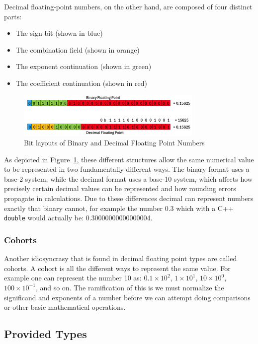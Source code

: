 \documentclass[acmsmall]{acmart}
\newcommand{\code}[1]{\texttt{#1}}
\begin{document}
Decimal floating-point numbers, on the other hand, are composed of four distinct parts:
\begin{itemize}
    \item The sign bit (shown in blue)
    \item The combination field (shown in orange)
    \item The exponent continuation (shown in green)
    \item The coefficient continuation (shown in red)
\end{itemize}

\begin{figure}[t]
    \centering
    \includegraphics[width=0.8\textwidth]{layout.png}
    \caption{Bit layouts of Binary and Decimal Floating Point Numbers}
    \label{fig:fp-layouts}
\end{figure}

As depicted in Figure~\ref{fig:fp-layouts}, these different structures allow the same numerical value to be represented in two fundamentally different ways. 
The binary format uses a base-2 system, while the decimal format uses a base-10 system, which affects how precisely certain decimal values can be represented and how rounding errors propagate in calculations.
Due to these differences decimal can represent numbers exactly that binary cannot, for example the number 0.3 which with a C++ \code{double} would actually be: 0.30000000000000004.

\subsubsection{Cohorts}
\label{sec:cohorts}
Another idiosyncrasy that is found in decimal floating point types are called cohorts\cite{ieee754-2019}.
A cohort is all the different ways to represent the same value.
For example one can represent the number 10 as: $0.1\times10^2$, $1\times10^1$, $10\times10^0$, $100\times10^{-1}$, and so on.
The ramification of this is we must normalize the significand and exponents of a number before we can attempt doing comparisons or other basic mathematical operations.

\subsection{Provided Types}
\end{document}
